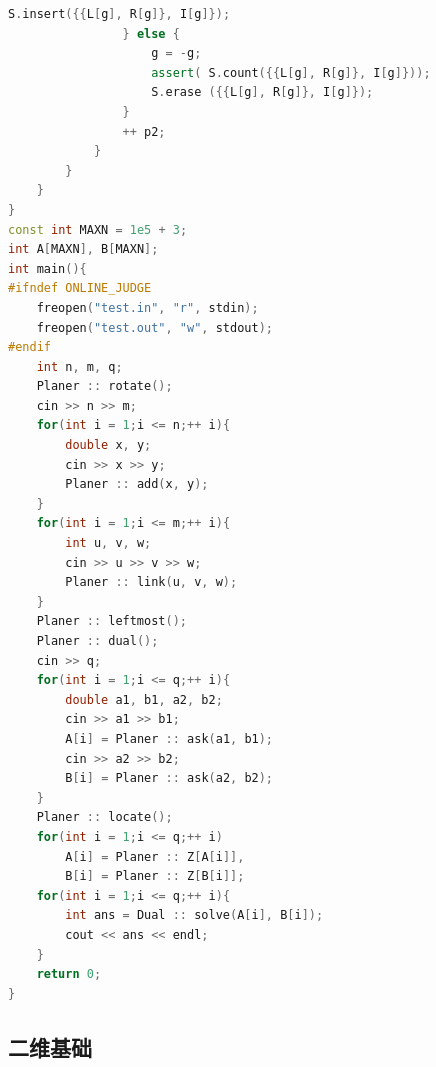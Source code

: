 \documentclass[10pt]{ctexart}
\begin{document}
\begin{multicols}{3}
\begin{lstlisting}[language={C++}]
                    S.insert({{L[g], R[g]}, I[g]});
                } else {
                    g = -g;
                    assert( S.count({{L[g], R[g]}, I[g]}));
                    S.erase ({{L[g], R[g]}, I[g]});
                }
                ++ p2;
            }
        }
    }
}
const int MAXN = 1e5 + 3;
int A[MAXN], B[MAXN];
int main(){
#ifndef ONLINE_JUDGE
    freopen("test.in", "r", stdin);
    freopen("test.out", "w", stdout);
#endif
    int n, m, q;
    Planer :: rotate();
    cin >> n >> m;
    for(int i = 1;i <= n;++ i){
        double x, y;
        cin >> x >> y;
        Planer :: add(x, y);
    }
    for(int i = 1;i <= m;++ i){
        int u, v, w;
        cin >> u >> v >> w;
        Planer :: link(u, v, w);
    }
    Planer :: leftmost();
    Planer :: dual();
    cin >> q;
    for(int i = 1;i <= q;++ i){
        double a1, b1, a2, b2;
        cin >> a1 >> b1;
        A[i] = Planer :: ask(a1, b1);
        cin >> a2 >> b2;
        B[i] = Planer :: ask(a2, b2);
    }
    Planer :: locate();
    for(int i = 1;i <= q;++ i)
        A[i] = Planer :: Z[A[i]],
        B[i] = Planer :: Z[B[i]];
    for(int i = 1;i <= q;++ i){
        int ans = Dual :: solve(A[i], B[i]);
        cout << ans << endl;
    }
    return 0;
}
\end{lstlisting}

    \subsection{二维基础}\label{ux4e8cux7ef4ux57faux7840}


\end{multicols}
\end{document}
